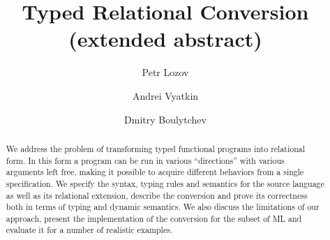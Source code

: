 \documentclass{llncs}
\begin{document}
\mainmatter

\title{Typed Relational Conversion\\
(extended abstract)}

\author{
  Petr Lozov \and Andrei Vyatkin \and Dmitry Boulytchev
}


\maketitle

\begin{abstract}
We address the problem of transforming typed functional programs into relational form. 
In this form a program can be run in various ``directions'' with various arguments left free, making it possible to
acquire different behaviors from a single specification. We specify the syntax, typing rules and semantics for the source language
as well as its relational extension, describe the conversion and prove its correctness both in terms of typing and dynamic
semantics. We also discuss the limitations of our approach, present the implementation of the conversion for the subset of ML and 
evaluate it for a number of realistic examples.
\end{abstract}





\end{document}
